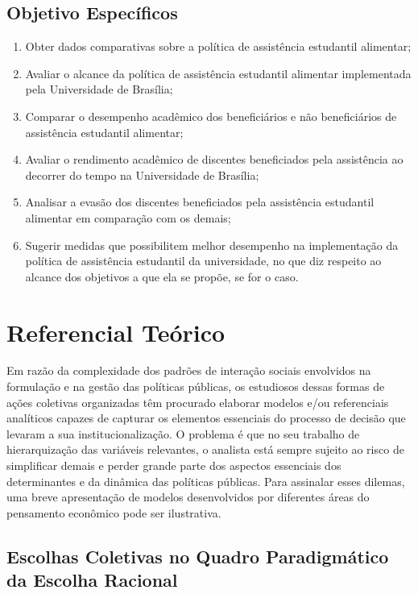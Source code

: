 \subsection{Objetivo Específicos}
\begin{enumerate}
	\item Obter dados comparativas sobre a política de assistência estudantil alimentar;
	\item Avaliar o alcance da política de assistência estudantil alimentar implementada pela Universidade de Brasília;
	\item Comparar o desempenho acadêmico dos beneficiários e não beneficiários de assistência estudantil alimentar;
	\item Avaliar o rendimento acadêmico de discentes beneficiados pela assistência ao decorrer do tempo na Universidade de Brasília; 
	\item Analisar a evasão dos discentes beneficiados pela assistência estudantil alimentar em comparação com os demais;
	\item Sugerir medidas que possibilitem melhor desempenho na implementação da política de assistência estudantil da universidade, no que diz respeito ao alcance dos objetivos a que ela se propõe, se for o caso.
\end{enumerate}%

\section{Referencial Teórico}

Em razão da complexidade dos padrões de interação sociais envolvidos na formulação e na gestão das políticas públicas, os estudiosos dessas formas de ações coletivas organizadas têm procurado elaborar modelos e/ou referenciais analíticos capazes de capturar os elementos essenciais do processo de decisão que levaram a sua institucionalização. O problema é que no seu trabalho de hierarquização das variáveis relevantes, o analista está sempre sujeito ao risco de simplificar demais e perder grande parte dos aspectos essenciais dos determinantes e da dinâmica das políticas públicas. Para assinalar esses dilemas, uma breve apresentação de modelos desenvolvidos por diferentes áreas do pensamento econômico pode ser ilustrativa. 



\subsection{Escolhas Coletivas no Quadro Paradigmático da Escolha Racional}

